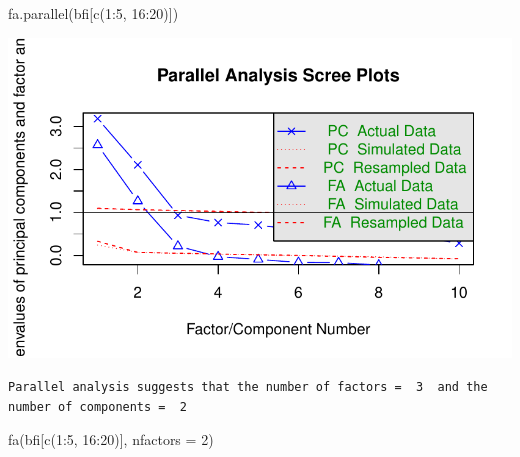 \documentclass[
  letterpaper,
  DIV=11,
  numbers=noendperiod]{scrreprt}
\newenvironment{Shaded}{\begin{snugshade}}{\end{snugshade}}
\newcommand{\AttributeTok}[1]{\textcolor[rgb]{0.40,0.45,0.13}{#1}}
\newcommand{\DecValTok}[1]{\textcolor[rgb]{0.68,0.00,0.00}{#1}}
\newcommand{\FunctionTok}[1]{\textcolor[rgb]{0.28,0.35,0.67}{#1}}
\newcommand{\NormalTok}[1]{\textcolor[rgb]{0.00,0.23,0.31}{#1}}
\newcommand{\SpecialCharTok}[1]{\textcolor[rgb]{0.37,0.37,0.37}{#1}}
\begin{document}
\begin{Shaded}
\begin{Highlighting}[]
\FunctionTok{fa.parallel}\NormalTok{(bfi[}\FunctionTok{c}\NormalTok{(}\DecValTok{1}\SpecialCharTok{:}\DecValTok{5}\NormalTok{, }\DecValTok{16}\SpecialCharTok{:}\DecValTok{20}\NormalTok{)])}
\end{Highlighting}
\end{Shaded}

\includegraphics{EFA_files/figure-pdf/unnamed-chunk-1-2.pdf}

\begin{verbatim}
Parallel analysis suggests that the number of factors =  3  and the number of components =  2 
\end{verbatim}

\begin{Shaded}
\begin{Highlighting}[]
\FunctionTok{fa}\NormalTok{(bfi[}\FunctionTok{c}\NormalTok{(}\DecValTok{1}\SpecialCharTok{:}\DecValTok{5}\NormalTok{, }\DecValTok{16}\SpecialCharTok{:}\DecValTok{20}\NormalTok{)], }\AttributeTok{nfactors =} \DecValTok{2}\NormalTok{)}
\end{Highlighting}
\end{Shaded}
\end{document}
